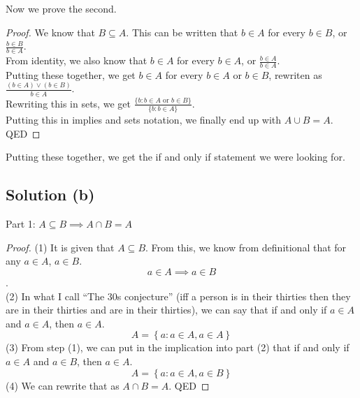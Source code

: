 \documentclass[12pt]{report}
\begin{document}
Now we prove the second.
\begin{proof}
    We know that $B \subseteq A$.
    This can be written that $b \in A$ for every $b \in B$, or $\frac{b \in B}{b \in A}$.\\
    From identity, we also know that $b \in A$ for every $b \in A$, or $\frac{b \in A}{b \in A}$.\\
    Putting these together, we get $b \in A$ for every $b \in A$ or $b \in B$, rewriten as $\frac{(b \in A) \vee (b \in B)}{b \in A}$.\\
    Rewriting this in sets, we get $\frac{\{b : b \in A \text{ or } b \in B\}}{\{b: b \in A\}}$.\\
    Putting this in implies and sets notation, we finally end up with \(A \cup B = A\). \\
    QED
\end{proof}
Putting these together, we get the if and only if statement we were looking for. 

\subsection{Solution (b)}
Part 1: $A \subseteq B \implies A \cap B = A$
\begin{proof}
    (1) It is given that $A \subseteq B$. 
    From this, we know from definitional that for any $a \in A$, $a \in B$.
    \[a \in A \implies a \in B\].\\
    (2) In what I call ``The 30s conjecture'' (iff a person is in their thirties then they are in their thirties and are in their thirties), we can say that if and only if $a \in A$ and $a \in A$, then $a \in A$.
    \[A = \left\{a: a \in A, a \in A\right\}\]
    (3) From step (1), we can put in the implication into part (2) that if and only if $a \in A$ and $a \in B$, then $a \in A$.
    \[A = \left\{a: a \in A, a \in B\right\}\]
    (4) We can rewrite that as $A \cap B = A$.
    QED
\end{proof}
\end{document}
